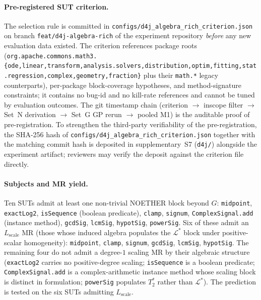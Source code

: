 \documentclass[acmsmall, screen]{acmart}
\begin{document}
\paragraph{Pre-registered SUT criterion.}
The selection rule is committed in
\texttt{configs/d4j\_algebra\_rich\_criterion.json} on branch
\texttt{feat/d4j-algebra-rich} of the experiment repository
\emph{before} any new evaluation data existed. The criterion
references package roots
(\texttt{org.apache.commons.math3.\{ode,linear,transform,analysis.solvers,distribution,optim,fitting,stat.regression,complex,geometry,fraction\}}
plus their \texttt{math.*} legacy counterparts), per-package
block-coverage hypotheses, and method-signature constraints; it
contains no bug-id and no kill-rate references and cannot be tuned by
evaluation outcomes. The git timestamp chain (criterion
$\rightarrow$ inscope filter $\rightarrow$ Set~N derivation
$\rightarrow$ Set~G GP rerun $\rightarrow$ pooled M1) is the
auditable proof of pre-registration. To strengthen the third-party
verifiability of the pre-registration, the SHA-256 hash of
\texttt{configs/d4j\_algebra\_rich\_criterion.json} together with
the matching commit hash is deposited in supplementary~S7 (\texttt{d4j/})
alongside the experiment artifact; reviewers may verify the deposit
against the criterion file directly.

\paragraph{Subjects and MR yield.}
Ten SUTs admit at least one non-trivial NOETHER block beyond $G$:
\texttt{midpoint}, \texttt{exactLog2}, \texttt{isSequence} (boolean
predicate), \texttt{clamp}, \texttt{signum},
\texttt{ComplexSignal.add} (instance method), \texttt{gcdSig},
\texttt{lcmSig}, \texttt{hypotSig}, \texttt{powerSig}. Six of these
admit an $L_{\mathrm{scale}}$ MR (those whose induced algebra
populates the $\mathcal{L}^{*}$ block under positive-scalar
homogeneity): \texttt{midpoint}, \texttt{clamp}, \texttt{signum},
\texttt{gcdSig}, \texttt{lcmSig}, \texttt{hypotSig}. The remaining
four do not admit a degree-$1$ scaling MR by their algebraic structure
(\texttt{exactLog2} carries no positive-degree scaling;
\texttt{isSequence} is a boolean predicate; \texttt{ComplexSignal.add}
is a complex-arithmetic instance method whose scaling block is
distinct in formulation; \texttt{powerSig} populates $T^{*}_{2}$
rather than $\mathcal{L}^{*}$). The prediction is tested on the six
SUTs admitting $L_{\mathrm{scale}}$.
\end{document}
